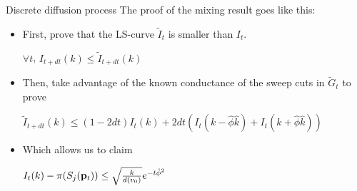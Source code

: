 \documentclass[../main.tex]{subfiles}
\begin{document}
	\begin{frame}{Discrete diffusion process}
		The proof of the mixing result goes like this:
		\begin{itemize}
				\item First, prove that the LS-curve $\tilde{I}_t$ is smaller than $I_t$. 
				\begin{lemma}
					\label{lemma:ls_curve_smaller_ls_curve_tilde}
					$\forall t$, 
					$I_{t+dt}(k) \leq \tilde{I}_{t+dt}(k)$
				\end{lemma} 
			\item Then, take advantage of the known conductance of the sweep cuts in $\tilde{G}_t$ to prove
				\begin{lemma}
					\label{lemma:recursive_LS_lower_bound}
					$\tilde{I}_{t+dt}(k) \leq (1-2dt) I_t(k) + 2dt (I_t(k-\hat{\phi} \hat{k}) + I_t(k + \hat{\phi}\hat{k}))$
				\end{lemma}
			\item Which allows us to claim
				\begin{lemma}
					\label{lemma:mixing_result} 
					$I_t(k) - \pi(S_j(\bold{p}_t)) \leq \sqrt{\frac{k}{d(v_0)}} e^{-t \hat{\phi}^2}$
				\end{lemma}
		\end{itemize}
	\end{frame}

\end{document}
